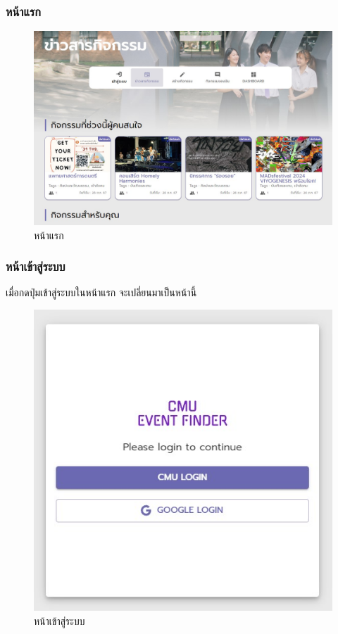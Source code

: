 \subsubsection{หน้าแรก}

\begin{figure}[H]
\begin{center}
\includegraphics[scale=0.5]{public/landing.jpg}
\end{center}
\caption[หน้าแรก]{หน้าแรก}
\label{fig:landing-page}
\end{figure}
\subsubsection{หน้าเข้าสู่ระบบ}
เมื่อกดปุ่มเข้าสู่ระบบในหน้าแรก จะเปลี่ยนมาเป็นหน้านี้
\begin{figure}[H]
\begin{center}
\includegraphics[scale=0.6]{public/login-page.jpg}
\end{center}
\caption[หน้าเข้าสู่ระบบ]{หน้าเข้าสู่ระบบ}
\label{fig:login-page}
\end{figure}
